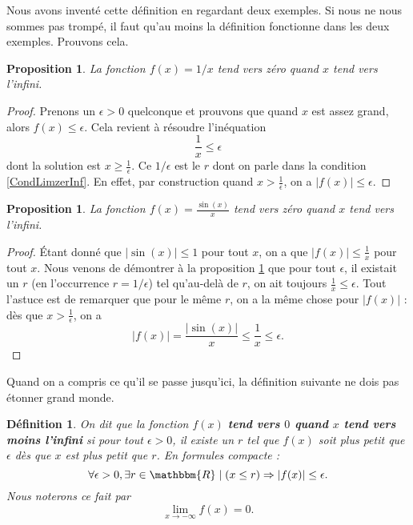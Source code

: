 \documentclass[a4paper,12pt]{book}
\newcommand{\eR}{\mathbbm{R}}
\newcounter{numtho}
\theoremstyle{mes_exemples}	\newtheorem{exemple}[numtho]{Exemple}
\theoremstyle{mes_tho}
\newtheorem{proposition}[numtho]{Proposition}
\newtheorem{definition}[numtho]{Définition}
\newcommand{\defe}[2]{\textbf{#1}\index{#2}}
\newcommand{\tq}{\mid}
\begin{document}
Nous avons inventé cette définition en regardant deux exemples. Si nous ne nous sommes pas trompé, il faut qu'au moins la définition fonctionne dans les deux exemples. Prouvons cela.

\begin{proposition}		\label{Propusxlimzerinf}
La fonction $f(x)=1/x$ tend vers zéro quand $x$ tend vers l'infini.
\end{proposition}

\begin{proof}
Prenons un $\epsilon>0$ quelconque et prouvons que quand $x$ est assez grand, alors $f(x)\leq\epsilon$. Cela revient à résoudre l'inéquation
\[ 
  \frac{ 1 }{ x }\leq\epsilon
\]
dont la solution est $x\geq \frac{1}{ \epsilon }$. Ce $1/\epsilon$ est le $r$ dont on parle dans la condition \eqref{CondLimzerInf}. En effet, par construction quand $x>\frac{1}{ \epsilon }$, on a $| f(x) |\leq\epsilon$.
\end{proof}


\begin{proposition}
La fonction $f(x)=\frac{ \sin(x) }{ x }$ tend vers zéro quand $x$ tend vers l'infini.
\end{proposition}

\begin{proof}
Étant donné que $| \sin(x) |\leq 1$ pour tout $x$, on a que $| f(x) |\leq \frac{ 1 }{ x }$ pour tout $x$. Nous venons de démontrer à la proposition \ref{Propusxlimzerinf} que pour tout $\epsilon$, il existait un $r$ (en l'occurrence $r=1/\epsilon$) tel qu'au-delà de $r$, on ait toujours $\frac{1}{ x }\leq\epsilon$. Tout l'astuce est de remarquer que pour le même $r$, on a la même chose pour $| f(x) |$ : dès que $x>\frac{ 1 }{ \epsilon }$, on a
\[ 
  | f(x) |=\frac{ |\sin(x)| }{ x }\leq \frac{1}{ x }\leq \epsilon.
\]
\end{proof}

Quand on a compris ce qu'il se passe jusqu'ici, la définition suivante ne dois pas étonner grand monde.

\begin{definition}
On dit que la fonction $f(x)$ \defe{tend vers $0$ quand $x$ tend vers \emph{moins} l'infini}{} si pour tout $\epsilon>0$, il existe un $r$ tel que $f(x)$ soit plus petit que $\epsilon$ dès que $x$ est \emph{plus petit} que $r$. En formules compacte :
\begin{equation}
\forall\epsilon>0,\exists r\in\eR\tq (x\leq r)\Rightarrow | f(x) |\leq \epsilon.
\end{equation}
Nous noterons ce fait par
\begin{equation}
\lim_{x\to-\infty}f(x)=0.
\end{equation}

\end{definition}
\end{document}
